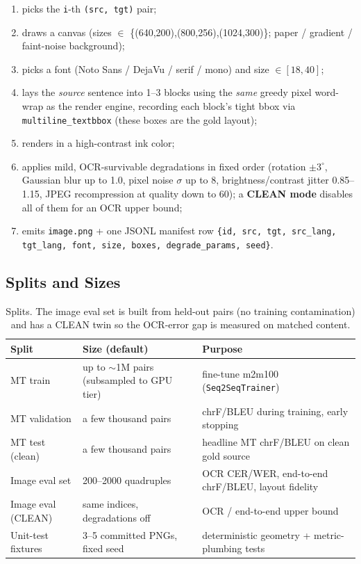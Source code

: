 \documentclass[12pt,a4paper]{article}
\begin{document}
\begin{enumerate}\setlength\itemsep{0.1em}
  \item picks the \texttt{i}-th \texttt{(src, tgt)} pair;
  \item draws a canvas (sizes $\in$ \{(640,200),(800,256),(1024,300)\}; paper / gradient / faint-noise background);
  \item picks a font (Noto Sans / DejaVu / serif / mono) and size $\in [18,40]$;
  \item lays the \emph{source} sentence into 1--3 blocks using the \emph{same} greedy pixel word-wrap as the render engine, recording each block's tight bbox via \texttt{multiline\_textbbox} (these boxes are the gold layout);
  \item renders in a high-contrast ink color;
  \item applies mild, OCR-survivable degradations in fixed order (rotation $\pm 3^\circ$, Gaussian blur up to 1.0, pixel noise $\sigma$ up to 8, brightness/contrast jitter 0.85--1.15, JPEG recompression at quality down to 60); a \textbf{CLEAN mode} disables all of them for an OCR upper bound;
  \item emits \texttt{image.png} + one JSONL manifest row \texttt{\{id, src, tgt, src\_lang, tgt\_lang, font, size, boxes, degrade\_params, seed\}}.
\end{enumerate}

\subsection{Splits and Sizes}

\begin{table}[H]
\centering
\caption{Splits. The image eval set is built from held-out pairs (no training contamination) and has a CLEAN twin so the OCR-error gap is measured on matched content.}
\small
\begin{tabularx}{\linewidth}{@{} l l L @{}}
\toprule
\textbf{Split} & \textbf{Size (default)} & \textbf{Purpose} \\
\midrule
MT train & up to $\sim$1M pairs (subsampled to GPU tier) & fine-tune m2m100 (\texttt{Seq2SeqTrainer}) \\
MT validation & a few thousand pairs & chrF/BLEU during training, early stopping \\
MT test (clean) & a few thousand pairs & headline MT chrF/BLEU on clean gold source \\
Image eval set & 200--2000 quadruples & OCR CER/WER, end-to-end chrF/BLEU, layout fidelity \\
Image eval (CLEAN) & same indices, degradations off & OCR / end-to-end upper bound \\
Unit-test fixtures & 3--5 committed PNGs, fixed seed & deterministic geometry + metric-plumbing tests \\
\bottomrule
\end{tabularx}
\end{table}
\end{document}
